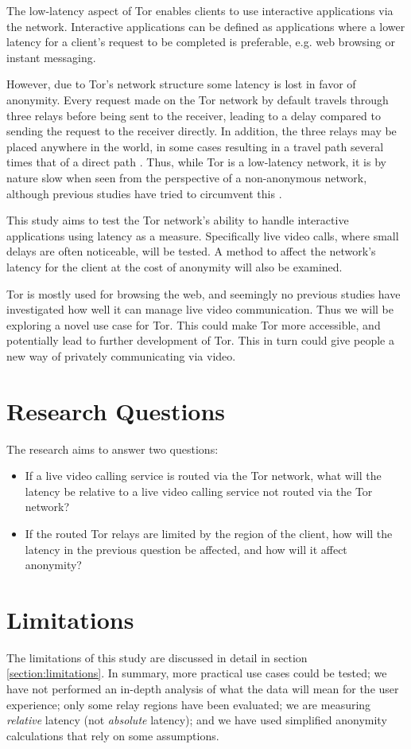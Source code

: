 \documentclass{kththesis}
\begin{document}
The low-latency aspect of Tor enables clients to use interactive applications via the network. Interactive applications can be defined as applications where a lower latency for a client's request to be completed is preferable, e.g. web browsing or instant messaging.

However, due to Tor's network structure some latency is lost in favor of anonymity. Every request made on the Tor network by default travels through three relays before being sent to the receiver, leading to a delay compared to sending the request to the receiver directly. In addition, the three relays may be placed anywhere in the world, in some cases resulting in a travel path several times that of a direct path \parencite{TorRelaysByCountry}. Thus, while Tor is a low-latency network, it is by nature slow when seen from the perspective of a non-anonymous network, although previous studies have tried to circumvent this \parencite{CLAPS}. 

This study aims to test the Tor network's ability to handle interactive applications using latency as a measure. Specifically live video calls, where small delays are often noticeable, will be tested. A method to affect the network's latency for the client at the cost of anonymity will also be examined.

Tor is mostly used for browsing the web, and seemingly no previous studies have investigated how well it can manage live video communication. Thus we will be exploring a novel use case for Tor. This could make Tor more accessible, and potentially lead to further development of Tor. This in turn could give people a new way of privately communicating via video.

\section{Research Questions}
The research aims to answer two questions:
\begin{itemize}
    \item If a live video calling service is routed via the Tor network, what will the latency be relative to a live video calling service not routed via the Tor network?
    \item If the routed Tor relays are limited by the region of the client, how will the latency in the previous question be affected, and how will it affect anonymity?
\end{itemize}

\section{Limitations}
The limitations of this study are discussed in detail in section \ref{section:limitations}. In summary, more practical use cases could be tested; we have not performed an in-depth analysis of what the data will mean for the user experience; only some relay regions have been evaluated; we are measuring \emph{relative} latency (not \emph{absolute} latency); and we have used simplified anonymity calculations that rely on some assumptions.
\end{document}
